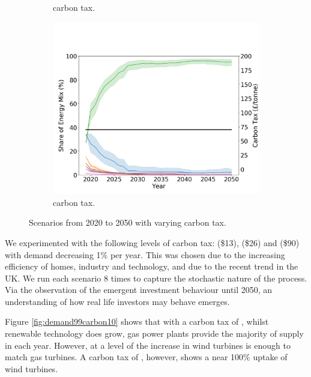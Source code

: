 \begin{figure}[h]
\begin{subfigure}[b]{0.6\textwidth}
		\caption[]%
		{ carbon tax.}
		\label{fig:demand99carbon20}
	\end{subfigure}
	\begin{subfigure}[b]{0.6\textwidth}
		\centering
		\includegraphics[width=\textwidth]{Chapter4/figures/scenarios/demand099-carbon70-datetime.png}
		\caption[Network2]%
		{\small {} carbon tax.}
		\label{fig:demand99carbon70}
	\end{subfigure}
	\caption{Scenarios from 2020 to 2050 with varying carbon tax.}
\end{figure}

We experimented with the following levels of carbon tax:  (\$13),  (\$26) and  (\$90) with demand decreasing 1\% per year. This was chosen due to the increasing efficiency of homes, industry and technology, and due to the recent trend in the UK. We run each scenario 8 times to capture the stochastic nature of the process. Via the observation of the emergent investment behaviour until 2050, an understanding of how real life investors may behave emerges.


Figure \ref{fig:demand99carbon10} shows that with a carbon tax of , whilst renewable technology does grow, gas power plants provide the majority of supply in each year. However, at a level of  the increase in wind turbines is enough to match gas turbines. A carbon tax of , however, shows a near 100\% uptake of wind turbines.


